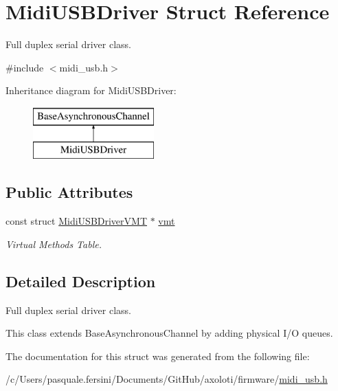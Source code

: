 \hypertarget{structMidiUSBDriver}{}\section{Midi\+U\+S\+B\+Driver Struct Reference}
\label{structMidiUSBDriver}


Full duplex serial driver class.  




{\ttfamily \#include $<$midi\+\_\+usb.\+h$>$}

Inheritance diagram for Midi\+U\+S\+B\+Driver\+:\begin{figure}[H]
\begin{center}
\leavevmode
\includegraphics[height=2.000000cm]{structMidiUSBDriver}
\end{center}
\end{figure}
\subsection*{Public Attributes}
\begin{DoxyCompactItemize}
\item 
const struct \hyperlink{structMidiUSBDriverVMT}{Midi\+U\+S\+B\+Driver\+V\+MT} $\ast$ \hyperlink{structMidiUSBDriver_a284fcf42283692d4626add45fa497cd5}{vmt}\hypertarget{structMidiUSBDriver_a284fcf42283692d4626add45fa497cd5}{}\label{structMidiUSBDriver_a284fcf42283692d4626add45fa497cd5}

\begin{DoxyCompactList}\small\item\em Virtual Methods Table. \end{DoxyCompactList}\end{DoxyCompactItemize}


\subsection{Detailed Description}
Full duplex serial driver class. 

This class extends {\ttfamily Base\+Asynchronous\+Channel} by adding physical I/O queues. 

The documentation for this struct was generated from the following file\+:\begin{DoxyCompactItemize}
\item 
/c/\+Users/pasquale.\+fersini/\+Documents/\+Git\+Hub/axoloti/firmware/\hyperlink{midi__usb_8h}{midi\+\_\+usb.\+h}\end{DoxyCompactItemize}
